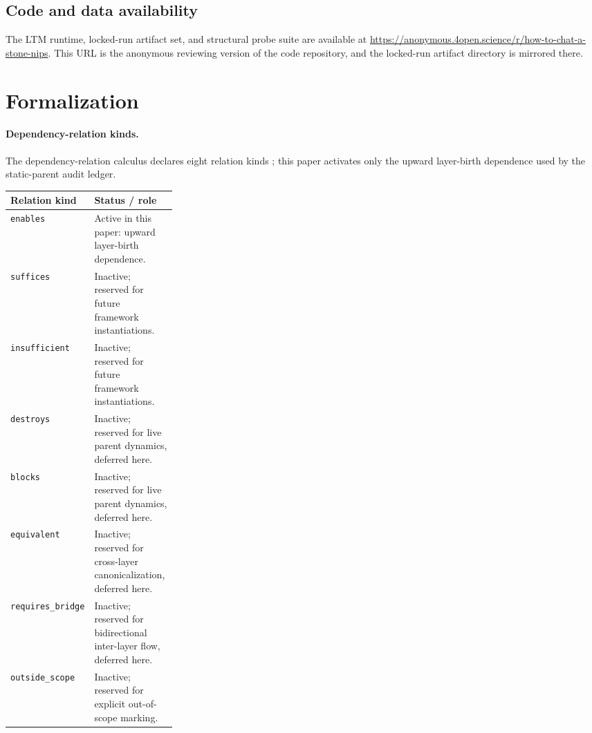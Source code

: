 \documentclass{article}
\theoremstyle{definition}
\begin{document}
\subsection*{Code and data availability}
The LTM runtime, locked-run artifact set, and structural probe suite are available at
\href{https://anonymous.4open.science/r/how-to-chat-a-stone-nips}{https://anonymous.4open.science/r/how-to-chat-a-stone-nips}.
This URL is the anonymous reviewing version of the code repository, and the locked-run artifact directory
 is mirrored there.
 \section{Formalization}\label{app:formalization}

\paragraph{Dependency-relation kinds.}
The dependency-relation calculus declares eight relation kinds \cite{Tsiokos2026FoundationsIII}; this paper activates only the upward layer-birth dependence used by the static-parent audit ledger.

\begin{table}[h]
\centering
\small
\begin{tabularx}{\linewidth}{>{\raggedright\arraybackslash}p{0.28\linewidth}>{\raggedright\arraybackslash}X}
\toprule
Relation kind & Status / role \\
\midrule
\texttt{enables} & Active in this paper: upward layer-birth dependence. \\
\texttt{suffices} & Inactive; reserved for future framework instantiations. \\
\texttt{insufficient} & Inactive; reserved for future framework instantiations. \\
\texttt{destroys} & Inactive; reserved for live parent dynamics, deferred here. \\
\texttt{blocks} & Inactive; reserved for live parent dynamics, deferred here. \\
\texttt{equivalent} & Inactive; reserved for cross-layer canonicalization, deferred here. \\
\texttt{requires\_bridge} & Inactive; reserved for bidirectional inter-layer flow, deferred here. \\
\texttt{outside\_scope} & Inactive; reserved for explicit out-of-scope marking. \\
\bottomrule
\end{tabularx}
\end{table}
\end{document}
